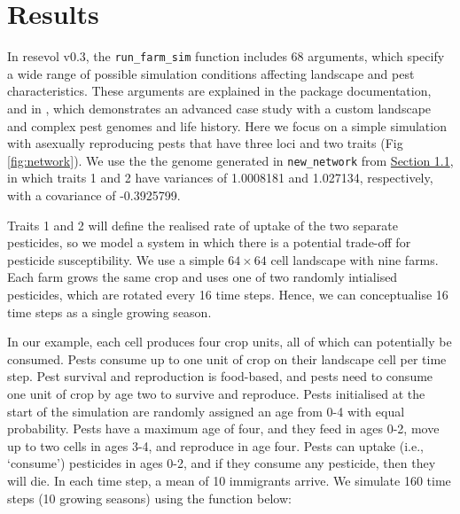 \documentclass[10pt,letterpaper]{article}
\begin{document}
\hypertarget{simulation}{%
\section{Results}\label{simulation}}

In resevol v0.3, the \texttt{run\_farm\_sim} function includes 68 arguments, which specify a wide range of possible simulation conditions affecting landscape and pest characteristics.
These arguments are explained in the package documentation, and in , which demonstrates an advanced case study with a custom landscape and complex pest genomes and life history.
Here we focus on a simple simulation with asexually reproducing pests that have three loci and two traits (Fig \ref{fig:network}).
We use the the genome generated in \texttt{new\_network} from \protect\hyperlink{mine_gmatrix}{Section 1.1}, in which traits 1 and 2 have variances of 1.0008181 and 1.027134, respectively, with a covariance of -0.3925799.

Traits 1 and 2 will define the realised rate of uptake of the two separate pesticides, so we model a system in which there is a potential trade-off for pesticide susceptibility.
We use a simple \(64 \times 64\) cell landscape with nine farms.
Each farm grows the same crop and uses one of two randomly intialised pesticides, which are rotated every 16 time steps.
Hence, we can conceptualise 16 time steps as a single growing season.

In our example, each cell produces four crop units, all of which can potentially be consumed.
Pests consume up to one unit of crop on their landscape cell per time step.
Pest survival and reproduction is food-based, and pests need to consume one unit of crop by age two to survive and reproduce.
Pests initialised at the start of the simulation are randomly assigned an age from 0-4 with equal probability.
Pests have a maximum age of four, and they feed in ages 0-2, move up to two cells in ages 3-4, and reproduce in age four.
Pests can uptake (i.e., `consume') pesticides in ages 0-2, and if they consume any pesticide, then they will die.
In each time step, a mean of 10 immigrants arrive.
We simulate 160 time steps (10 growing seasons) using the function below:
\end{document}
